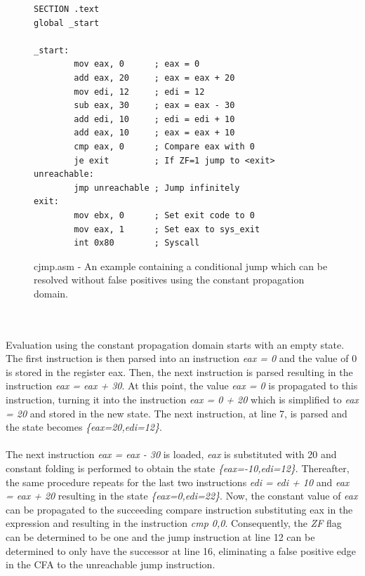 \documentclass{kththesis}
\renewcommand{\it}[1]{\textit{#1}}
\begin{document}
\begin{figure}[!ht]
    \centering
\begin{tcolorbox}
\begin{verbatim}
SECTION .text
global _start

_start:
        mov eax, 0      ; eax = 0
        add eax, 20     ; eax = eax + 20
        mov edi, 12     ; edi = 12
        sub eax, 30     ; eax = eax - 30
        add edi, 10     ; edi = edi + 10
        add eax, 10     ; eax = eax + 10
        cmp eax, 0      ; Compare eax with 0
        je exit         ; If ZF=1 jump to <exit>
unreachable:            
        jmp unreachable ; Jump infinitely
exit:
        mov ebx, 0      ; Set exit code to 0
        mov eax, 1      ; Set eax to sys_exit
        int 0x80        ; Syscall
\end{verbatim}
\end{tcolorbox}
\caption{cjmp.asm - An example containing a conditional jump which can be resolved without false positives using the constant propagation domain.}
    \label{fig:cjmp.asm}
\end{figure}
\noindent
\\ \\
Evaluation using the constant propagation domain starts with an empty state. The first instruction is then parsed into an instruction \it{eax = 0} and the value of 0 is stored in the register eax. Then, the next instruction is parsed resulting in the instruction \it{eax = eax + 30}. At this point, the value \it{eax = 0} is propagated to this instruction, turning it into the instruction \it{eax = 0 + 20} which is simplified to \it{eax = 20} and stored in the new state. The next instruction, at line 7, is parsed and the state becomes \it{\{eax=20,edi=12\}}.
\\ \\
The next instruction \it{eax = eax - 30} is loaded, \it{eax} is substituted with 20 and constant folding is performed to obtain the state \it{\{eax=-10,edi=12\}}. Thereafter, the same procedure repeats for the last two instructions \it{edi = edi + 10} and \it{eax = eax + 20} resulting in the state \it{\{eax=0,edi=22\}}. Now, the constant value of \it{eax} can be propagated to the succeeding compare instruction substituting eax in the expression and resulting in the instruction \it{cmp 0,0}. Consequently, the \it{ZF} flag can be determined to be one and the jump instruction at line 12 can be determined to only have the successor at line 16, eliminating a false positive edge in the CFA to the unreachable jump instruction. 
\end{document}
